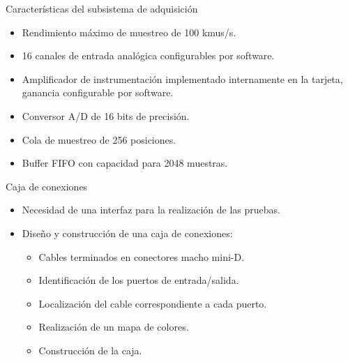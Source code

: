 \documentclass[utf8, compress]			{beamer}
\begin{document}
\begin{frame}{Características del subsistema de adquisición}
    \begin{itemize}
	\item Rendimiento máximo de muestreo de 100 kmus/s.
	\item 16 canales de entrada analógica configurables por software.
	\item Amplificador de instrumentación implementado internamente en
	    la tarjeta, ganancia configurable por software.
	\item Conversor A/D de 16 bits de precisión.
	\item Cola de muestreo de 256 posiciones.
	\item Buffer FIFO con capacidad para 2048 muestras.
    \end{itemize}
\end{frame}

\begin{frame}{Caja de conexiones}
    \begin{itemize}
	\item Necesidad de una interfaz para la realización de las pruebas.
	\item Diseño y construcción de una caja de conexiones:
	    \begin{itemize}
		\item Cables terminados en conectores macho mini-D.
		\item Identificación de los puertos de entrada/salida.
		\item Localización del cable correspondiente a cada puerto.
		\item Realización de un mapa de colores.
		\item Construcción de la caja.
	    \end{itemize}
    \end{itemize}
\end{frame}
\end{document}

